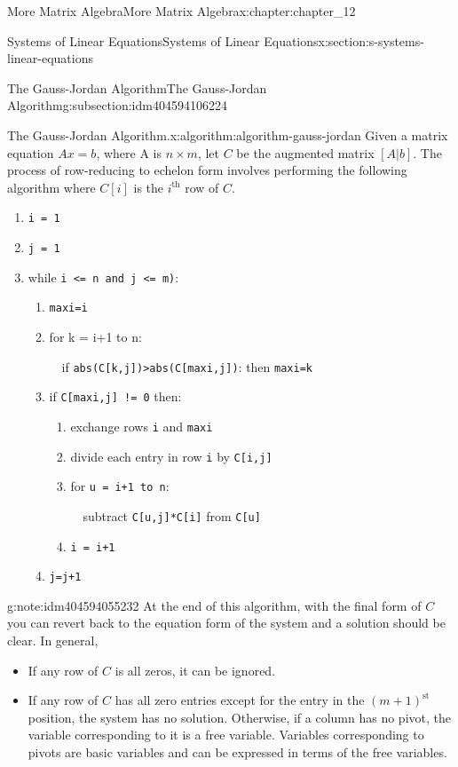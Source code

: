 \documentclass[twoside,10pt,]{book}
\newcommand{\mono}[1]{\texttt{#1}}
\numberwithin{equation}{section}
\begin{document}
\begin{chapterptx}{More Matrix Algebra}{}{More Matrix Algebra}{}{}{x:chapter:chapter_12}
\begin{sectionptx}{Systems of Linear Equations}{}{Systems of Linear Equations}{}{}{x:section:s-systems-linear-equations}
\begin{subsectionptx}{The Gauss-Jordan Algorithm}{}{The Gauss-Jordan Algorithm}{}{}{g:subsection:idm404594106224}
\begin{algorithm}{The Gauss-Jordan Algorithm.}{}{x:algorithm:algorithm-gauss-jordan}%
%
Given a matrix equation \(A x = b\), where A is \(n \times m\), let \(C\) be the augmented matrix \([A | b]\). The process of row-reducing to echelon form involves performing the following algorithm where \(C[i]\)  is the \(i^{\textrm{th}}\)  row of \(C\).%
\begin{enumerate}[label=(\arabic*)]
\item{}\mono{i = 1}%
\item{}\mono{j = 1}%
\item{}while \mono{i <=  n  and  j <=  m)}:%
\begin{enumerate}[label=(\alph*)]
\item{}\mono{maxi=i}%
\item{}for k = i+1 to n:%
\par
\(\quad\)if  \mono{abs(C[k,j])>abs(C[maxi,j])}: then \mono{maxi=k}%
\item{}if \mono{C[maxi,j] != 0} then:%
\begin{enumerate}[label=(\roman*)]
\item{}exchange rows \mono{i} and \mono{maxi}%
\item{}divide each entry in row \mono{i} by \mono{C[i,j]}%
\item{}for \mono{u = i+1 to n}:%
\par
\(\quad\)subtract \mono{C[u,j]*C[i]} from \mono{C[u]}%
\item{}\mono{i = i+1}%
\end{enumerate}
%
\item{}\mono{j=j+1}%
\end{enumerate}
%
\end{enumerate}
%
\end{algorithm}
\begin{note}{}{g:note:idm404594055232}%
At the end of this algorithm, with the final form of \(C\) you can revert back to the equation form of the system and a solution should be clear. In general,%
\begin{itemize}[label=\textbullet]
\item{}If any row of \(C\) is all zeros, it can be ignored.%
\item{}If any row of \(C\) has all zero entries except for the entry in the \((m+1)^{\textrm{st}}\) position, the system has no solution.   Otherwise, if a column has no pivot, the variable corresponding to it is a free variable.  Variables corresponding to pivots are basic variables and can be expressed in terms of the free variables.%

\end{itemize}
\end{note}
\end{subsectionptx}
\end{sectionptx}
\end{chapterptx}
\end{document}
